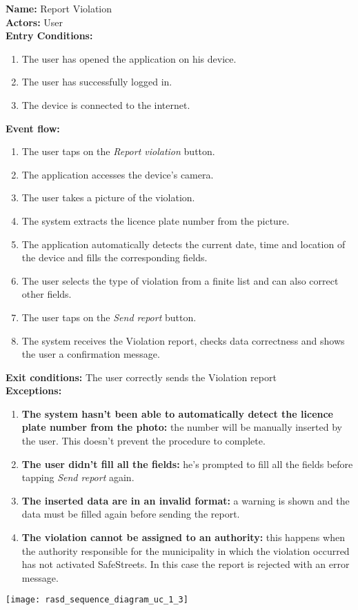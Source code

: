 \begin{usecase}{1.3}
    \textbf{Name: }Report Violation \\
    \textbf{Actors: } User \\
    \textbf{Entry Conditions:}
    \begin{enumerate}
        \item The user has opened the application on his device.
        \item The user has successfully logged in.
        \item The device is connected to the internet.
    \end{enumerate}
    \textbf{Event flow:}
    \begin{enumerate}
        \item The user taps on the \emph{Report violation} button.
        \item The application accesses the device's camera.
        \item The user takes a picture of the violation.
        \item The system extracts the licence plate number from the picture.
        \item The application automatically detects the current date, time
        and location of the device and fills the corresponding fields.
        \item The user selects the type of violation from a finite list and
        can also correct other fields.
        \item The user taps on the \emph{Send report} button.
        \item The system receives the Violation report, checks data correctness
        and shows the user a confirmation message.
    \end{enumerate}
    \textbf{Exit conditions: } The user correctly sends the Violation report \\
    \textbf{Exceptions: }
    \begin{enumerate}
        \item \textbf{The system hasn't been able to automatically detect the
        licence plate number from the photo:} the number will be manually
        inserted by the user. This doesn't prevent the procedure to complete.
        \item \textbf{The user didn't fill all the fields:} he's prompted to
        fill all the fields before tapping \emph{Send report} again.
        \item \textbf{The inserted data are in an invalid format:} a warning is
        shown and the data must be filled again before sending the report.
        \item \textbf{The violation cannot be assigned to an authority:} this
        happens when the authority responsible for the municipality in which
        the violation occurred has not activated SafeStreets. In this case the
        report is rejected with an error message.
    \end{enumerate}
    \tcblower
    \centering
    \texttt{[image: rasd\_sequence\_diagram\_uc\_1\_3]}
\end{usecase}
